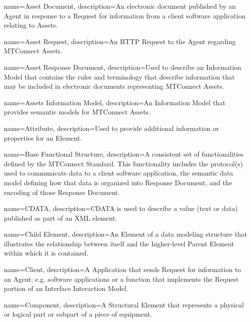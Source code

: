 {
    name={Asset Document},
	description={An electronic document published by an \gls{Agent} in response to a \gls{Request} for information from a client software application relating to Assets.
}
}

{
    name={Asset Request},
	description={An \gls{HTTP Request} to the \gls{Agent} regarding \glspl{MTConnect Asset}.}
}

{
    name={Asset Response Document},
	description={Used to describe an \gls{Information Model} that contains the rules and terminology that describe information that may be included in electronic documents representing \glspl{MTConnect Asset}.}
}

{
    name={Assets Information Model},
	description={An {{Information Model}} that provides semantic models for \glspl{MTConnect Asset}.}
}

{
    name={Attribute},
	description={Used to provide additional information or properties for an \gls{Element}.
}
}

{
    name={Base Functional Structure},
	description={A consistent set of functionalities defined by the MTConnect Standard. This functionality includes the protocol(s) used to communicate data to a client software application, the \gls{semantic data model} defining how that data is organized into \gls{Response Document}, and the encoding of those \gls{Response Document}.
}
}

{
    name={CDATA},
	description={\gls{CDATA} is used to describe a value (text or data) published as part of an XML element.}
}

{
    name={Child Element},
	description={An \gls{Element} of a data modeling structure that illustrates the relationship between itself and the higher-level \gls{Parent Element} within which it is contained.}
}

{
    name={Client},
	description={A \gls{Application} that sends \gls{Request} for information to an \gls{Agent}; e.g. software applications or a function that implements the \gls{Request} portion of an \gls{Interface} \gls{Interaction Model}.
}
}

{
    name={Component},
	description={A \gls{Structural Element} that represents a physical or logical part or subpart of a piece of equipment.}
}

